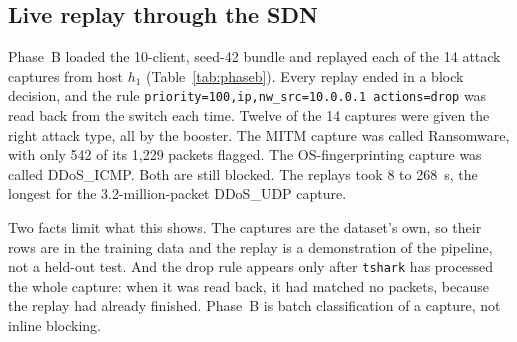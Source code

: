 \subsection{Live replay through the SDN}
\label{sec:replay}
Phase~B loaded the 10-client, seed-42 bundle and replayed each of the 14 attack captures from host $h_1$ (Table~\ref{tab:phaseb}). Every replay ended in a block decision, and the rule \texttt{priority=100,ip,nw\_src=10.0.0.1 actions=drop} was read back from the switch each time. Twelve of the 14 captures were given the right attack type, all by the booster. The MITM capture was called Ransomware, with only 542 of its 1,229 packets flagged. The OS-fingerprinting capture was called DDoS\_ICMP. Both are still blocked. The replays took 8 to 268~s, the longest for the 3.2-million-packet DDoS\_UDP capture.

Two facts limit what this shows. The captures are the dataset's own, so their rows are in the training data and the replay is a demonstration of the pipeline, not a held-out test. And the drop rule appears only after \texttt{tshark} has processed the whole capture: when it was read back, it had matched no packets, because the replay had already finished. Phase~B is batch classification of a capture, not inline blocking.

